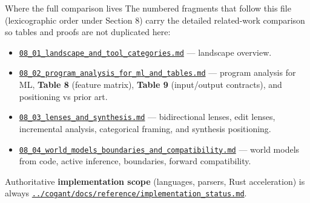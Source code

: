 \documentclass[
  ignorenonframetext,
]{beamer}
\providecommand{\tightlist}{%
  \setlength{\itemsep}{0pt}\setlength{\parskip}{0pt}}
\begin{document}
\begin{frame}[fragile]{Where the full comparison lives}
\protect{}\label{where-the-full-comparison-lives}
The numbered fragments that follow this file (lexicographic order under
Section 8) carry the detailed related-work comparison so tables and
proofs are not duplicated here:

\begin{itemize}
\tightlist
\item
  \href{08_01_landscape_and_tool_categories.md}{\texttt{08\_01\_landscape\_and\_tool\_categories.md}}
  --- landscape overview.
\item
  \href{08_02_program_analysis_for_ml_and_tables.md}{\texttt{08\_02\_program\_analysis\_for\_ml\_and\_tables.md}}
  --- program analysis for ML, \textbf{Table 8} (feature matrix),
  \textbf{Table 9} (input/output contracts), and positioning vs prior
  art.
\item
  \href{08_03_lenses_and_synthesis.md}{\texttt{08\_03\_lenses\_and\_synthesis.md}}
  --- bidirectional lenses, edit lenses, incremental analysis,
  categorical framing, and synthesis positioning.
\item
  \href{08_04_world_models_boundaries_and_compatibility.md}{\texttt{08\_04\_world\_models\_boundaries\_and\_compatibility.md}}
  --- world models from code, active inference, boundaries, forward
  compatibility.
\end{itemize}

Authoritative \textbf{implementation scope} (languages, parsers, Rust
acceleration) is always
\href{../cogant/docs/reference/implementation_status.md}{\texttt{../cogant/docs/reference/implementation\_status.md}}.
\end{frame}
\end{document}
